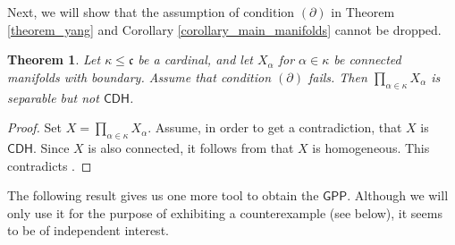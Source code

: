 \documentclass{amsart}
\theoremstyle{plain}
\newtheorem{theorem}{Theorem}[section]
\theoremstyle{definition}
\newcommand{\CDH}{\mathsf{CDH}}
\newcommand{\GPP}{\mathsf{GPP}}
\newcommand{\cccc}{\mathfrak{c}}
\begin{document}
Next, we will show that the assumption of condition $(\partial)$ in Theorem \ref{theorem_yang} and Corollary \ref{corollary_main_manifolds} cannot be dropped.

\begin{theorem}\label{theorem_optimality_boundaries}
Let $\kappa\leq\cccc$ be a cardinal, and let $X_\alpha$ for $\alpha\in\kappa$ be connected manifolds with boundary. Assume that condition $(\partial)$ fails. Then $\prod_{\alpha\in\kappa}X_\alpha$ is separable but not $\CDH$.
\end{theorem}
\begin{proof}
Set $X=\prod_{\alpha\in\kappa}X_\alpha$. Assume, in order to get a contradiction, that $X$ is~$\CDH$. Since $X$ is also connected, it follows from \cite[Corollary 3.2]{van_mill_article_2013} that $X$ is homogeneous. This contradicts \cite{ganea}.
\end{proof}

The following result gives us one more tool to obtain the $\GPP$. Although we will only use it for the purpose of exhibiting a counterexample (see below), it seems to be of independent interest.
\end{document}
